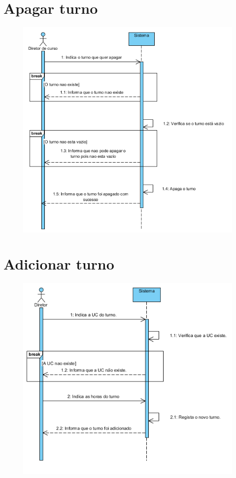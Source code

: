 \documentclass[12pt,a4paper]{report}
\begin{document}
\begin{appendices}
\section{Apagar turno}
\begin{figure}[H]
	\centering 
	\includegraphics[width=\textwidth]{modelacao/use_case_diagram/apagarturno.png}  
\end{figure}

\section{Adicionar turno}
\begin{figure}[H]
	\centering 
	\includegraphics[width=\textwidth]{modelacao/use_case_diagram/adicionarturno.png}  
\end{figure}


\end{appendices}
\end{document}
